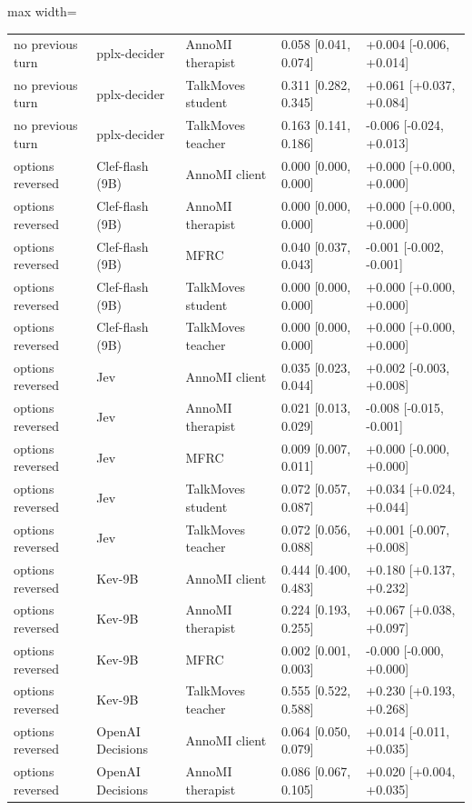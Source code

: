 \begin{table}[t]
\begin{adjustbox}{max width=\linewidth}
\begin{tabular}{lllll}
no previous turn & pplx-decider & AnnoMI therapist & 0.058 [0.041, 0.074] & +0.004 [-0.006, +0.014] \\
no previous turn & pplx-decider & TalkMoves student & 0.311 [0.282, 0.345] & +0.061 [+0.037, +0.084] \\
no previous turn & pplx-decider & TalkMoves teacher & 0.163 [0.141, 0.186] & -0.006 [-0.024, +0.013] \\
options reversed & Clef-flash (9B) & AnnoMI client & 0.000 [0.000, 0.000] & +0.000 [+0.000, +0.000] \\
options reversed & Clef-flash (9B) & AnnoMI therapist & 0.000 [0.000, 0.000] & +0.000 [+0.000, +0.000] \\
options reversed & Clef-flash (9B) & MFRC & 0.040 [0.037, 0.043] & -0.001 [-0.002, -0.001] \\
options reversed & Clef-flash (9B) & TalkMoves student & 0.000 [0.000, 0.000] & +0.000 [+0.000, +0.000] \\
options reversed & Clef-flash (9B) & TalkMoves teacher & 0.000 [0.000, 0.000] & +0.000 [+0.000, +0.000] \\
options reversed & Jev & AnnoMI client & 0.035 [0.023, 0.044] & +0.002 [-0.003, +0.008] \\
options reversed & Jev & AnnoMI therapist & 0.021 [0.013, 0.029] & -0.008 [-0.015, -0.001] \\
options reversed & Jev & MFRC & 0.009 [0.007, 0.011] & +0.000 [-0.000, +0.000] \\
options reversed & Jev & TalkMoves student & 0.072 [0.057, 0.087] & +0.034 [+0.024, +0.044] \\
options reversed & Jev & TalkMoves teacher & 0.072 [0.056, 0.088] & +0.001 [-0.007, +0.008] \\
options reversed & Kev-9B & AnnoMI client & 0.444 [0.400, 0.483] & +0.180 [+0.137, +0.232] \\
options reversed & Kev-9B & AnnoMI therapist & 0.224 [0.193, 0.255] & +0.067 [+0.038, +0.097] \\
options reversed & Kev-9B & MFRC & 0.002 [0.001, 0.003] & -0.000 [-0.000, +0.000] \\
options reversed & Kev-9B & TalkMoves teacher & 0.555 [0.522, 0.588] & +0.230 [+0.193, +0.268] \\
options reversed & OpenAI Decisions & AnnoMI client & 0.064 [0.050, 0.079] & +0.014 [-0.011, +0.035] \\
options reversed & OpenAI Decisions & AnnoMI therapist & 0.086 [0.067, 0.105] & +0.020 [+0.004, +0.035] \\

\end{tabular}
\end{adjustbox}
\end{table}
